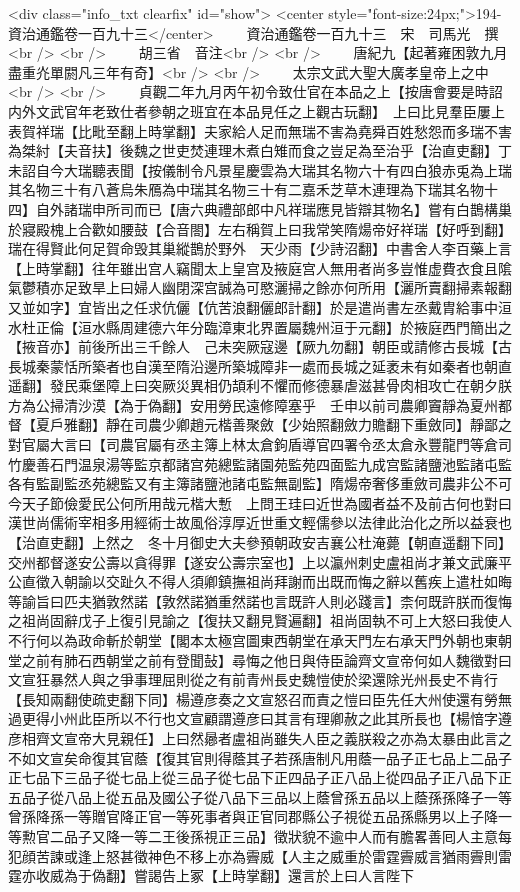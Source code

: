 <div class="info_txt clearfix" id="show">
<center style="font-size:24px;">194-資治通鑑卷一百九十三</center>
  　　資治通鑑卷一百九十三　宋　司馬光　撰<br />
<br />
　　胡三省　音注<br />
<br />
　　唐紀九【起著雍困敦九月盡重灮單閼凡三年有奇】<br />
<br />
　　太宗文武大聖大廣孝皇帝上之中<br />
<br />
　　貞觀二年九月丙午初令致仕官在本品之上【按唐會要是時詔内外文武官年老致仕者參朝之班宜在本品見任之上觀古玩翻】　上曰比見羣臣屢上表賀祥瑞【比毗至翻上時掌翻】夫家給人足而無瑞不害為堯舜百姓愁怨而多瑞不害為桀紂【夫音扶】後魏之世吏焚連理木煮白雉而食之豈足為至治乎【治直吏翻】丁未詔自今大瑞聽表聞【按儀制令凡景星慶雲為大瑞其名物六十有四白狼赤兎為上瑞其名物三十有八蒼烏朱鴈為中瑞其名物三十有二嘉禾芝草木連理為下瑞其名物十四】自外諸瑞申所司而已【唐六典禮部郎中凡祥瑞應見皆辯其物名】嘗有白鵲構巢於寢殿槐上合歡如腰鼓【合音閤】左右稱賀上曰我常笑隋煬帝好祥瑞【好呼到翻】瑞在得賢此何足賀命毁其巢縱鵲於野外　天少雨【少詩沼翻】中書舍人李百藥上言【上時掌翻】往年雖出宫人竊聞太上皇宫及掖庭宫人無用者尚多豈惟虚費衣食且隂氣鬱積亦足致旱上曰婦人幽閉深宫誠為可愍灑掃之餘亦何所用【灑所賣翻掃素報翻又並如字】宜皆出之任求伉儷【伉苦浪翻儷郎計翻】於是遣尚書左丞戴胄給事中洹水杜正倫【洹水縣周建德六年分臨漳東北界置屬魏州洹于元翻】於掖庭西門簡出之【掖音亦】前後所出三千餘人　己未突厥寇邊【厥九勿翻】朝臣或請修古長城【古長城秦蒙恬所築者也自漢至隋沿邊所築城障非一處而長城之延袤未有如秦者也朝直遥翻】發民乘堡障上曰突厥災異相仍頡利不懼而修德暴虐滋甚骨肉相攻亡在朝夕朕方為公掃清沙漠【為于偽翻】安用勞民遠修障塞乎　壬申以前司農卿竇靜為夏州都督【夏戶雅翻】靜在司農少卿趙元楷善聚斂【少始照翻斂力贍翻下重斂同】靜鄙之對官屬大言曰【司農官屬有丞主簿上林太倉鉤盾導官四署令丞太倉永豐龍門等倉司竹慶善石門温泉湯等監京都諸宫苑總監諸園苑監苑四面監九成宫監諸鹽池監諸屯監各有監副監丞苑總監又有主簿諸鹽池諸屯監無副監】隋煬帝奢侈重斂司農非公不可今天子節儉愛民公何所用哉元楷大慙　上問王珪曰近世為國者益不及前古何也對曰漢世尚儒術宰相多用經術士故風俗淳厚近世重文輕儒參以法律此治化之所以益衰也【治直吏翻】上然之　冬十月御史大夫參預朝政安吉襄公杜淹薨【朝直遥翻下同】　交州都督遂安公壽以貪得罪【遂安公壽宗室也】上以瀛州刺史盧祖尚才兼文武廉平公直徵入朝諭以交趾久不得人須卿鎮撫祖尚拜謝而出既而悔之辭以舊疾上遣杜如晦等諭旨曰匹夫猶敦然諾【敦然諾猶重然諾也言既許人則必踐言】柰何既許朕而復悔之祖尚固辭戊子上復引見諭之【復扶又翻見賢遍翻】祖尚固執不可上大怒曰我使人不行何以為政命斬於朝堂【閣本太極宫圖東西朝堂在承天門左右承天門外朝也東朝堂之前有肺石西朝堂之前有登聞鼔】尋悔之他日與侍臣論齊文宣帝何如人魏徵對曰文宣狂暴然人與之爭事理屈則從之有前青州長史魏愷使於梁還除光州長史不肯行【長知兩翻使疏吏翻下同】楊遵彦奏之文宣怒召而責之愷曰臣先任大州使還有勞無過更得小州此臣所以不行也文宣顧謂遵彦曰其言有理卿赦之此其所長也【楊愔字遵彦相齊文宣帝大見親任】上曰然曏者盧祖尚雖失人臣之義朕殺之亦為太暴由此言之不如文宣矣命復其官蔭【復其官則得蔭其子若孫唐制凡用蔭一品子正七品上二品子正七品下三品子從七品上從三品子從七品下正四品子正八品上從四品子正八品下正五品子從八品上從五品及國公子從八品下三品以上蔭曾孫五品以上蔭孫孫降子一等曾孫降孫一等贈官降正官一等死事者與正官同郡縣公子視從五品孫縣男以上子降一等勲官二品子又降一等二王後孫視正三品】徵狀貌不逾中人而有膽畧善囘人主意每犯顔苦諫或逢上怒甚徵神色不移上亦為霽威【人主之威重於雷霆霽威言猶雨霽則雷霆亦收威為于偽翻】嘗謁告上冢【上時掌翻】還言於上曰人言陛下